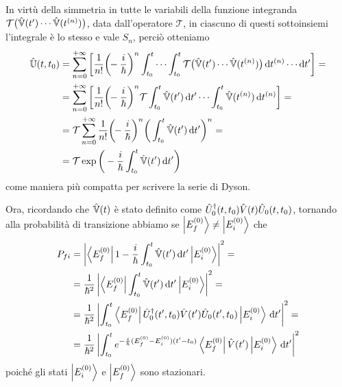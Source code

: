 In virtù della simmetria in tutte le variabili della funzione integranda $\mathcal T\big(\hat{\mathbb V}(t')\cdots\hat{\mathbb V}(t^{(n)})\big)$, data dall'operatore $\mathcal T$, in ciascuno di questi sottoinsiemi l'integrale è lo stesso e vale $S_n$, perciò otteniamo
\begin{equation}
	\begin{split}
		\hat{\mathbb U}(t,t_0)
		&=\sum_{n=0}^{+\infty}\bigg[\frac1{n!}\bigg(\!\!-\frac{i}{\hbar}\bigg)^n\int_{t_0}^t\cdots\int_{t_0}^t\mathcal T\big(\hat{\mathbb V}(t')\cdots\hat{\mathbb V}(t^{(n)})\big)\,\textup{d} t^{(n)}\cdots\textup{d} t'\bigg]=\\
		&=\sum_{n=0}^{+\infty}\bigg[\frac1{n!}\bigg(\!\!-\frac{i}{\hbar}\bigg)^n\mathcal T\int_{t_0}^t\hat{\mathbb V}(t')\,\textup{d} t'\cdots\int_{t_0}^t\hat{\mathbb V}(t^{(n)})\,\textup{d} t^{(n)}\bigg]=\\
		&=\mathcal T\sum_{n=0}^{+\infty}\frac1{n!}\bigg(\!\!-\frac{i}{\hbar}\bigg)^n\bigg(\int_{t_0}^t\hat{\mathbb V}(t')\,\textup{d} t'\bigg)^n=\\
		&=\mathcal T\exp\bigg(-\frac{i}{\hbar}\int_{t_0}^t\hat{\mathbb V}(t')\,\textup{d} t'\bigg)
	\end{split}
	\label{eq:serie-dyson-alt}
\end{equation}
come maniera più compatta per scrivere la serie di Dyson.

Ora, ricordando che $\hat{\mathbb V}(t)$ è stato definito come ${\hat{U}}^\dagger_0(t,t_0)\hat{V}(t)\hat{U}_0(t,t_0)$, tornando alla probabilità di transizione abbiamo se $\left|{E_f^{(0)}}\right\rangle\ne\left|{E_i^{(0)}}\right\rangle$ che
\begin{equation}
	\begin{split}
		P_{fi}&=\left|{\left\langle{E_f^{(0)}}\right|1-\frac{i}{\hbar}\int_{t_0}^t\hat{\mathbb V}(t')\,\textup{d} t'\left|{E_i^{(0)}}\right\rangle}\right|^2=\\
		&=\frac1{\hbar^2}\left|{\left\langle{E_f^{(0)}}\right|\int_{t_0}^t\hat{\mathbb V}(t')\,\textup{d} t'\left|{E_i^{(0)}}\right\rangle}\right|^2=\\
		&=\frac1{\hbar^2}\left|{\int_{t_0}^t\left\langle{E_f^{(0)}}\right|{\hat{U}}^\dagger_0(t',t_0)\hat{V}(t')\hat{U}_0(t',t_0)\left|{E_i^{(0)}}\right\rangle\,\textup{d} t'}\right|^2=\\
		&=\frac1{\hbar^2}\left|{\int_{t_0}^te^{-\frac{i}{\hbar}(E_f^{(0)}-E_i^{(0)})(t'-t_0)}\left\langle{E_f^{(0)}}\right|\hat{V}(t')\left|{E_i^{(0)}}\right\rangle\,\textup{d} t'}\right|^2
	\end{split}
	\label{eq:probabilita-transizione-autostati-dipendente-tempo}
\end{equation}
poich\'e gli stati $\left|{E_i^{(0)}}\right\rangle$ e $\left|{E_f^{(0)}}\right\rangle$ sono stazionari.

